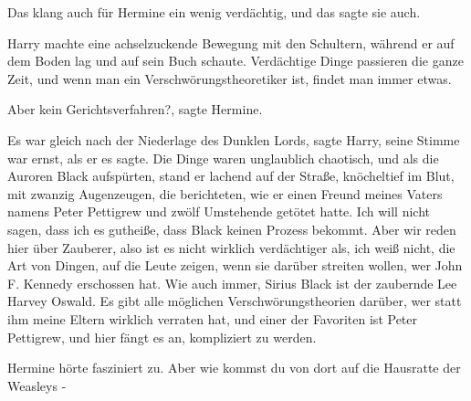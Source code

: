 Das klang auch für Hermine ein wenig verdächtig, und das sagte sie auch.

Harry machte eine achselzuckende Bewegung mit den Schultern, während er auf dem
Boden lag und auf sein Buch schaute. \glqq{}Verdächtige Dinge passieren die
ganze Zeit, und wenn man ein Verschwörungstheoretiker ist, findet man immer
etwas.\grqq{}

\glqq{}Aber kein Gerichtsverfahren?\grqq{}, sagte Hermine.

\glqq{}Es war gleich nach der Niederlage des Dunklen Lords\grqq{}, sagte Harry,
seine Stimme war ernst, als er es sagte. \glqq{}Die Dinge waren unglaublich
chaotisch, und als die Auroren Black aufspürten, stand er lachend auf der
Straße, knöcheltief im Blut, mit zwanzig Augenzeugen, die berichteten, wie er
einen Freund meines Vaters namens Peter Pettigrew und zwölf Umstehende getötet
hatte. Ich will nicht sagen, dass ich es gutheiße, dass Black keinen Prozess
bekommt. Aber wir reden hier über Zauberer, also ist es nicht wirklich
verdächtiger als, ich weiß nicht, die Art von Dingen, auf die Leute zeigen, wenn
sie darüber streiten wollen, wer John F. Kennedy erschossen hat. Wie auch immer,
Sirius Black ist der zaubernde Lee Harvey Oswald. Es gibt alle möglichen
Verschwörungstheorien darüber, wer statt ihm meine Eltern wirklich verraten hat,
und einer der Favoriten ist Peter Pettigrew, und hier fängt es an, kompliziert
zu werden.\grqq{}

Hermine hörte fasziniert zu. \glqq{}Aber wie kommst du von dort auf die
Hausratte der Weasleys -\grqq{}

